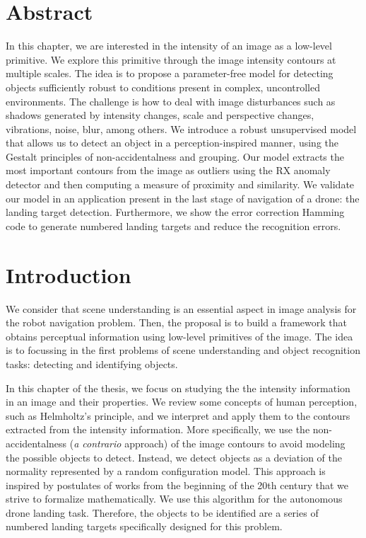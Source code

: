 \section*{Abstract}
\noindent In this chapter, we are interested in the intensity of an image as a low-level primitive. We explore this primitive through the image intensity contours at multiple scales. The idea is to propose a parameter-free model for detecting objects sufficiently robust to conditions present in complex, uncontrolled environments. The challenge is how to deal with image disturbances such as shadows generated by intensity changes, scale and perspective changes, vibrations, noise, blur, among others. We introduce a robust unsupervised model that allows us to detect an object in a perception-inspired manner, using the Gestalt principles of non-accidentalness and grouping. Our model extracts the most important contours from the image as outliers using the RX anomaly detector and then computing a measure of proximity and similarity. We validate our model in an application present in the last stage of navigation of a drone: the landing target detection. Furthermore, we show the error correction Hamming code to generate numbered landing targets and reduce the recognition errors.


\section{Introduction}\label{sec:introduction_ch1}
We consider that scene understanding is an essential aspect in image analysis for the robot navigation problem. Then, the proposal is to build a framework that obtains perceptual information using low-level primitives of the image. The idea is to focussing in the first problems of scene understanding and object recognition tasks: detecting and identifying objects.  

In this chapter of the thesis, we focus on studying the the intensity information in an image and their properties. We review some concepts of human perception, such as Helmholtz's principle, and we interpret and apply them to the contours extracted from the intensity information.  More specifically, we use the non-accidentalness (\textit{a contrario} approach) of the image contours to avoid modeling the possible objects to detect. Instead, we detect objects as a deviation of the normality represented by a random configuration model. This approach is inspired by postulates of works from the beginning of the 20th century that we strive to formalize mathematically. We use this algorithm for the autonomous drone landing task. Therefore, the objects to be identified are a series of numbered landing targets specifically designed for this problem.

